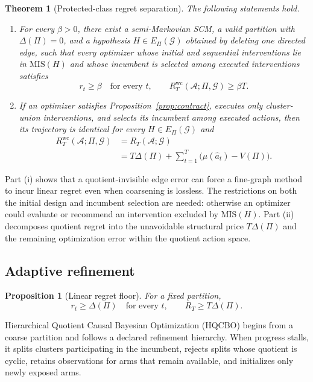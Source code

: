\documentclass[twoside]{article}
\newtheorem{theorem}{Theorem}
\newtheorem{proposition}{Proposition}
\newcommand{\Gg}{\mathcal{G}}
\begin{document}
\begin{theorem}[Protected-class regret separation]
\label{thm:separation}
The following statements hold.
\begin{enumerate}[label=(\roman*),leftmargin=1.6em,itemsep=2pt,topsep=2pt]
  \item For every $\beta>0$, there exist a semi-Markovian SCM, a valid
  partition with $\Delta(\Pi)=0$, and a hypothesis
  $H\in E_\Pi(\Gg)$ obtained by deleting one directed edge, such that every
  optimizer whose initial and sequential interventions lie in
  $\mathrm{MIS}(H)$ and whose incumbent is selected among executed
  interventions satisfies
  \[
    r_t\ge\beta\quad\text{for every }t,
    \qquad R_T^{\mathrm{wc}}(\mathcal A;\Pi,\Gg)\ge\beta T.
  \]
  \item If an optimizer satisfies Proposition~\ref{prop:contract}, executes
  only cluster-union interventions, and selects its incumbent among executed
  actions, then its trajectory is identical for every
  $H\in E_\Pi(\Gg)$ and
  \[
  \begin{aligned}
  R_T^{\mathrm{wc}}(\mathcal A;\Pi,\Gg)
  &=R_T(\mathcal A;\Gg)\\
  &=T\Delta(\Pi)
   +\sum_{t=1}^{T}\bigl(\mu(\hat a_t)-V(\Pi)\bigr).
  \end{aligned}
  \]
\end{enumerate}
\end{theorem}

Part (i) shows that a quotient-invisible edge error can force a fine-graph
method to incur linear regret even when coarsening is lossless. The
restrictions on both the initial design and incumbent selection are needed:
otherwise an optimizer could evaluate or recommend an intervention excluded
by $\mathrm{MIS}(H)$. Part (ii) decomposes quotient regret into the
unavoidable structural price $T\Delta(\Pi)$ and the remaining optimization
error within the quotient action space.

\subsection{Adaptive refinement}
\label{sec:refinement}

\begin{proposition}[Linear regret floor]
\label{prop:floor}
For a fixed partition,
\[
 r_t\ge\Delta(\Pi)\quad\text{for every }t,
 \qquad R_T\ge T\Delta(\Pi).
\]
\end{proposition}

Hierarchical Quotient Causal Bayesian Optimization (HQCBO) begins from a
coarse partition and follows a declared refinement hierarchy. When progress
stalls, it splits clusters participating in the incumbent, rejects splits
whose quotient is cyclic, retains observations for arms that remain
available, and initializes only newly exposed arms.
\end{document}
